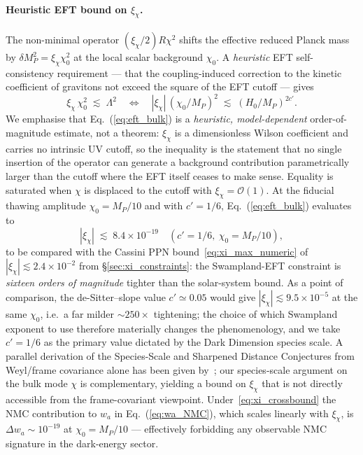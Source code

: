 \documentclass[epjc3,twocolumn]{svjour3}
\begin{document}
\paragraph{Heuristic EFT bound on $\xi_\chi$.}
The non-minimal operator $(\xi_\chi/2)R\chi^2$ shifts the effective reduced
Planck mass by $\delta M_P^2 = \xi_\chi\chi_0^2$ at the local scalar
background $\chi_0$. A \emph{heuristic} EFT self-consistency requirement ---
that the coupling-induced correction to the kinetic coefficient of
gravitons not exceed the square of the EFT cutoff --- gives
\begin{equation}
  \xi_\chi\,\chi_0^{2}\;\lesssim\;\Lambda^{2}
  \quad\Longleftrightarrow\quad
  |\xi_\chi|\,(\chi_0/M_P)^{2}\;\lesssim\;(H_0/M_P)^{2c'}.
  \label{eq:eft_bulk}
\end{equation}
We emphasise that Eq.~(\ref{eq:eft_bulk}) is a \emph{heuristic, model-dependent}
order-of-magnitude estimate, not a theorem: $\xi_\chi$ is a dimensionless
Wilson coefficient and carries no intrinsic UV cutoff, so the inequality
is the statement that no single insertion of the operator can generate a
background contribution parametrically larger than the cutoff where the
EFT itself ceases to make sense. Equality is saturated when $\chi$ is
displaced to the cutoff with $\xi_\chi=\mathcal{O}(1)$.
At the fiducial thawing amplitude $\chi_0 = M_P/10$ and with
$c' = 1/6$, Eq.~(\ref{eq:eft_bulk}) evaluates to
\begin{equation}
  \boxed{\;|\xi_\chi|\;\lesssim\;8.4\times 10^{-19}
    \quad(c'=1/6,\ \chi_0=M_P/10),\;}
  \label{eq:xi_crossbound}
\end{equation}
to be compared with the Cassini PPN bound~\eqref{eq:xi_max_numeric} of
$|\xi_\chi|\lesssim 2.4\times 10^{-2}$ from \S\ref{sec:xi_constraints}:
the Swampland-EFT constraint is \emph{sixteen orders of magnitude} tighter
than the solar-system bound. As a point of comparison, the de-Sitter--slope
value $c'\simeq 0.05$ would give $|\xi_\chi|\lesssim 9.5\times 10^{-5}$ at
the same $\chi_0$, i.e.\ a far milder $\sim\!250\times$ tightening; the
choice of which Swampland exponent to use therefore materially changes the
phenomenology, and we take $c'=1/6$ as the primary value dictated by the
Dark Dimension species scale. A parallel derivation of the Species-Scale and
Sharpened Distance Conjectures from Weyl/frame covariance alone has been
given by~\cite{FrameCovariance2025}; our species-scale argument on the bulk
mode $\chi$ is complementary, yielding a bound on $\xi_\chi$ that is not
directly accessible from the frame-covariant viewpoint.
Under~\eqref{eq:xi_crossbound} the NMC contribution to $w_a$ in
Eq.~(\ref{eq:wa_NMC}), which scales linearly with $\xi_\chi$, is
$\Delta w_a \sim 10^{-19}$ at $\chi_0 = M_P/10$ --- effectively forbidding
any observable NMC signature in the dark-energy sector.
\end{document}
